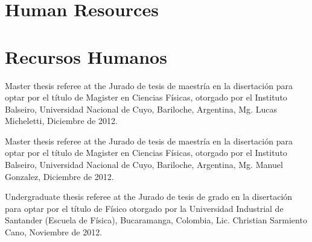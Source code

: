 \ifeng
\section*{Human Resources}
\else
\section*{Recursos Humanos}
\fi

\ifeng
Master thesis referee at the
\else
Jurado de tesis de maestría en la 
\fi
disertación para optar por el título de Magister en Ciencias Físicas, otorgado por el Instituto Balseiro, Universidad Nacional de Cuyo, Bariloche, Argentina, Mg. Lucas Micheletti, Diciembre de 2012.

\ifeng
Master thesis referee at the
\else
Jurado de tesis de maestría en la 
\fi
disertación para optar por el título de Magister en Ciencias Físicas, otorgado por el Instituto Balseiro, Universidad Nacional de Cuyo, Bariloche, Argentina, Mg. Manuel Gonzalez, Diciembre de 2012.

\ifeng
Undergraduate thesis referee at the
\else
Jurado de tesis de grado en la 
\fi
disertación para optar por el título de Físico otorgado por la Universidad Industrial de Santander (Escuela de Física), Bucaramanga, Colombia, Lic. Christian Sarmiento Cano, Noviembre de 2012.
